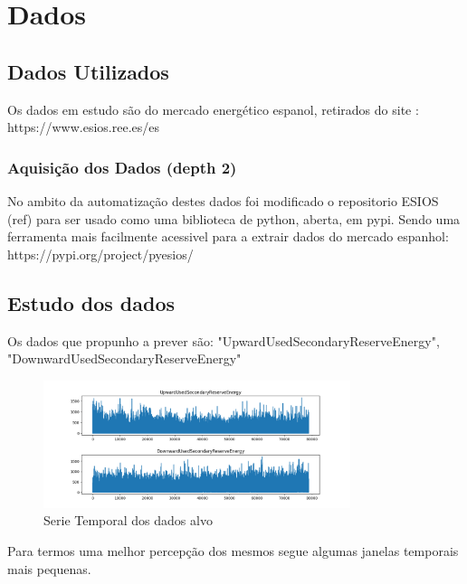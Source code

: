 \chapter{Dados}

\section{Dados Utilizados \label{se:dados_crus}}

Os dados em estudo são do mercado energético espanol, retirados do site :
https://www.esios.ree.es/es




\subsection{Aquisição dos Dados (depth 2)}

No ambito da automatização destes dados foi modificado o repositorio ESIOS (ref) para ser usado como uma biblioteca de python, aberta, em pypi.
Sendo uma ferramenta mais facilmente acessivel para a extrair dados do mercado espanhol:
https://pypi.org/project/pyesios/



\section{Estudo dos dados  \label{se:dados_estudo}}

Os dados que propunho a prever são: "UpwardUsedSecondaryReserveEnergy", "DownwardUsedSecondaryReserveEnergy"

\begin{figure}[H]
  \centering
  \includegraphics[width=0.8\textwidth]{../plots/targets_timeseries.png}
  \caption{Serie Temporal dos dados alvo}
  \label{fig:target_timeseries}
\end{figure}

Para termos uma melhor percepção dos mesmos segue algumas janelas temporais mais pequenas.

